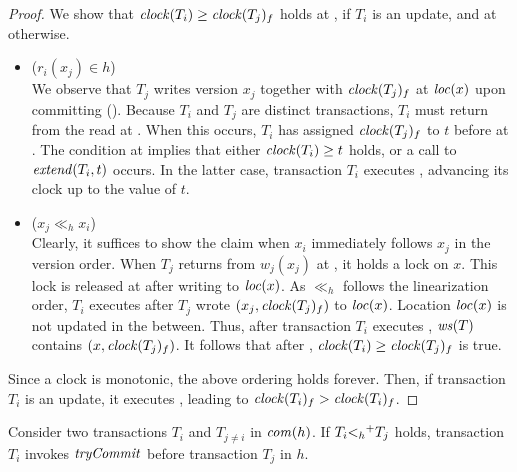 \begin{proof}

  We show that $\clockOf{T_i} \geq \clockOf{T_j}_f$ holds at , if $T_i$ is an update, and at  otherwise.
  \begin{itemize}
  \item ($r_i(x_j) \in h$)\\
    We observe that $T_j$ writes version $x_j$ together with $\clockOf{T_j}_f$ at $\locationOf{x}$ upon committing ().
    Because $T_i$ and $T_j$ are distinct transactions, $T_i$ must return from the read at .
    When this occurs, $T_i$ has assigned $\clockOf{T_j}_f$ to $t$ before at .
    The condition at  implies that either $\clockOf{T_i} \geq t$ holds, or a call to $\stmExtend{T_i,t}$ occurs.
    In the latter case, transaction $T_i$ executes , advancing its clock up to the value of $t$.
  \item ($x_j \ll_h x_i$)\\
    Clearly, it suffices to show the claim when $x_i$ immediately follows $x_j$ in the version order.
    When $T_j$ returns from $w_j(x_j)$ at , it holds a lock on $x$.
    This lock is released at  after writing to $\locationOf{x}$.
    As $\ll_h$ follows the linearization order, $T_i$ executes  after $T_j$ wrote $(x_j, \clockOf{T_j}_f)$ to $\locationOf{x}$.
    Location $\locationOf{x}$ is not updated in the between.
    Thus, after transaction $T_i$ executes , $\writeSetOf{T}$ contains $(x,\clockOf{T_j}_f)$.
    It follows that after , $\clockOf{T_i} \geq \clockOf{T_j}_f$ is true.
  \end{itemize}
  Since a clock is monotonic, the above ordering holds forever.
  Then, if transaction $T_i$ is an update, it executes , leading to $\clockOf{T_i}_f > \clockOf{T_i}_f$.
\end{proof}

\begin{proposition}
  Consider two transactions $T_i$ and $T_{j \neq i}$ in $\committed{h}$.
  If $T_i \closureOf{<_h} T_j$ holds, transaction $T_i$ invokes $\stmTryCommitFunction$ before transaction $T_j$ in $h$.
\end{proposition}

